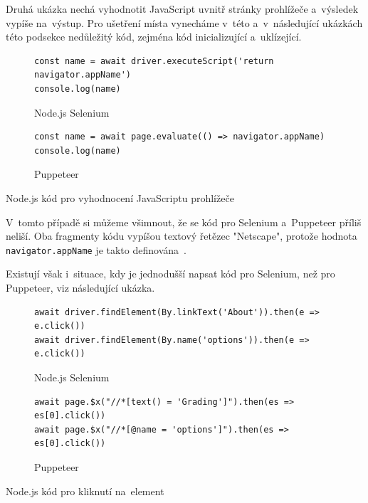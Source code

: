 \documentclass[12pt, a4paper, twoside]{article}
\begin{document}
	Druhá ukázka nechá vyhodnotit JavaScript uvnitř stránky prohlížeče a~výsledek vypíše na~výstup. Pro ušetření místa vynecháme v~této a~v~následující ukázkách této podsekce nedůležitý kód, zejména kód inicializující a~uklízející.
	\newpage
		 \begin{codefigure}[H]
		\begin{subfigure}[t]{\textwidth}
			\begin{lstlisting}[style=MyJavaScript]
const name = await driver.executeScript('return navigator.appName')
console.log(name)
			\end{lstlisting}
			\caption{Node.js Selenium}
		\end{subfigure}   
	\end{codefigure}
	\begin{codefigure}[H]\ContinuedFloat
		\begin{subfigure}[t]{\textwidth}
			\begin{lstlisting}[style=MyJavaScript]
const name = await page.evaluate(() => navigator.appName)
console.log(name)
			\end{lstlisting}
			\caption{Puppeteer}
		\end{subfigure}
		\caption{Node.js kód pro vyhodnocení JavaScriptu prohlížeče}
	\end{codefigure}

	V~tomto případě si můžeme všimnout, že se kód pro Selenium a~Puppeteer příliš neliší. Oba fragmenty kódu vypíšou textový řetězec "Netscape", protože hodnota \texttt{navigator.appName} je takto definována~\cite{navigator.appName}.
	
	Existují však i~situace, kdy je jednodušší napsat kód pro Selenium, než pro Puppeteer, viz následující ukázka.
\begin{codefigure}[H]
	\begin{subfigure}[t]{\textwidth}
		\begin{lstlisting}[style=MyJavaScript]
await driver.findElement(By.linkText('About')).then(e => e.click())
await driver.findElement(By.name('options')).then(e => e.click())
		\end{lstlisting}
		\caption{Node.js Selenium}
	\end{subfigure}   
\end{codefigure}
\begin{codefigure}[H]\ContinuedFloat
	\begin{subfigure}[t]{\textwidth}
		\begin{lstlisting}[style=MyJavaScript]
await page.$x("//*[text() = 'Grading']").then(es => es[0].click())
await page.$x("//*[@name = 'options']").then(es => es[0].click())
		\end{lstlisting}
		\caption{Puppeteer}
	\end{subfigure}
	\caption{Node.js kód pro kliknutí na~element}
\end{codefigure}
\end{document}
